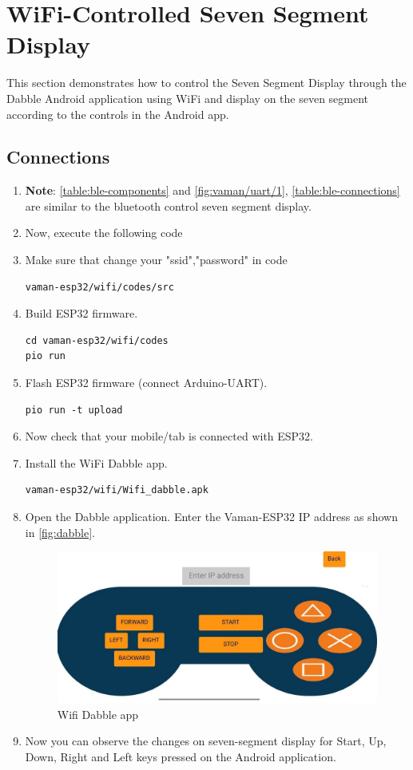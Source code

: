 \section{WiFi-Controlled Seven Segment Display}
This section demonstrates how to control the Seven Segment Display through the
Dabble Android application using WiFi and display on the seven segment according
to the controls in the Android app.

\subsection{Connections}
\begin{enumerate}
\item \textbf{Note}: \autoref{table:ble-components} and
\autoref{fig:vaman/uart/1}, \autoref{table:ble-connections} are similar to the
bluetooth control seven segment display.
\item Now, execute the following code
\item Make sure that change your "ssid","password" in code 
\begin{lstlisting}
vaman-esp32/wifi/codes/src
\end{lstlisting}
\item Build ESP32 firmware.
\begin{lstlisting}
cd vaman-esp32/wifi/codes
pio run 
\end{lstlisting}
\item Flash ESP32 firmware (connect Arduino-UART).
\begin{lstlisting}
pio run -t upload
\end{lstlisting}
\item Now check that your mobile/tab is connected with ESP32.
\item Install the WiFi Dabble app.
\begin{lstlisting}
vaman-esp32/wifi/Wifi_dabble.apk
\end{lstlisting}

\item Open the Dabble application. Enter the Vaman-ESP32 IP address as shown 
in \autoref{fig:dabble}.
\begin{figure}[!ht]
\centering
\includegraphics[width=0.6\columnwidth]{vaman-esp32/wifi/figs/wifi.jpg}
\caption{Wifi Dabble app}
\label{fig:dabble}
\end{figure}
\item Now you can observe the changes on seven-segment display for Start, Up, 
Down, Right and Left keys pressed on the Android application.
\end{enumerate}